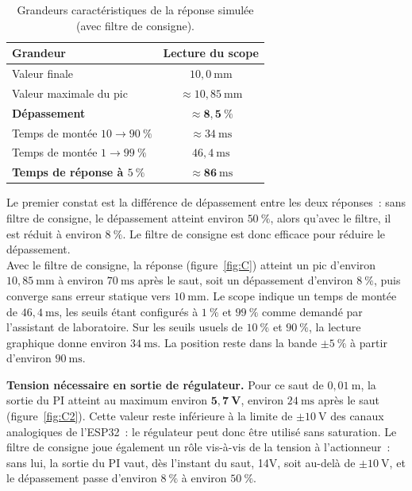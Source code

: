 ﻿\documentclass[a4paper,5pt]{article}
\begin{document}
\begin{table}[H]
\centering
\begin{tabular}{lc}
\toprule
Grandeur & Lecture du scope \\
\midrule
Valeur finale                          & $10{,}0~\mathrm{mm}$ \\
Valeur maximale du pic                 & $\approx 10{,}85~\mathrm{mm}$ \\
\textbf{Dépassement}                   & $\mathbf{\approx 8{,}5~\%}$ \\
Temps de montée $10 \rightarrow 90~\%$ & $\approx 34~\mathrm{ms}$ \\
Temps de montée $1 \rightarrow 99~\%$  & $46{,}4~\mathrm{ms}$ \\
\textbf{Temps de réponse à $5~\%$}     & $\mathbf{\approx 86~\mathrm{ms}}$ \\
\bottomrule
\end{tabular}
\caption{Grandeurs caractéristiques de la réponse simulée (avec filtre de consigne).}
\label{tab:C}
\end{table}
Le premier constat est la différence de dépassement entre les deux réponses~: sans filtre de consigne, le dépassement atteint environ $50~\%$, alors qu'avec le filtre, il est réduit à environ $8~\%$. Le filtre de consigne est donc efficace pour réduire le dépassement.\\
Avec le filtre de consigne, la réponse (figure~\ref{fig:C}) atteint un pic
d'environ $10{,}85~\mathrm{mm}$ à environ $70~\mathrm{ms}$ après le saut, soit
un dépassement d'environ $8~\%$, puis converge sans erreur statique vers
$10~\mathrm{mm}$. Le scope indique un temps de montée de $46{,}4~\mathrm{ms}$,
les seuils étant configurés à $1~\%$ et $99~\%$ comme demandé par l'assistant de
laboratoire. Sur les seuils usuels de $10~\%$ et $90~\%$, la lecture graphique
donne environ $34~\mathrm{ms}$. La position reste dans la bande $\pm 5~\%$ à
partir d'environ $90~\mathrm{ms}$.

\textbf{Tension nécessaire en sortie de régulateur.} Pour ce saut de
$0{,}01~\mathrm{m}$, la sortie du PI atteint au maximum environ
$\mathbf{5{,}7~V}$, environ $24~\mathrm{ms}$ après le saut
(figure~\ref{fig:C2}). Cette valeur reste inférieure à la limite de
$\pm 10~\mathrm{V}$ des canaux analogiques de l'ESP32~: le régulateur peut donc
être utilisé sans saturation. Le filtre de consigne joue également un rôle vis-à-vis de la tension à l'actionneur~: sans lui, la sortie du PI vaut, dès l'instant du saut, 14V,
soit au-delà de $\pm 10~\mathrm{V}$, et le dépassement passe d'environ $8~\%$ à
environ $50~\%$.
\end{document}
